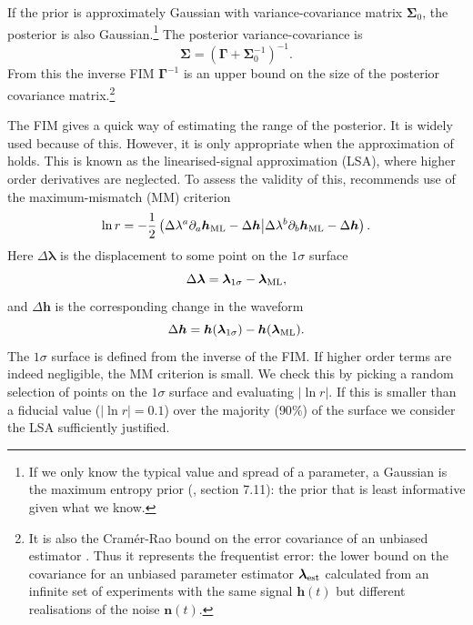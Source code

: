 If the prior is approximately Gaussian with variance-covariance matrix $\boldsymbol{\Sigma}_0$, the posterior is also Gaussian.\footnote{If we only know the typical value and spread of a parameter, a Gaussian is the maximum entropy prior (\citealt{Jaynes2003}, section 7.11): the prior that is least informative given what we know.} The posterior variance-covariance is \citep{Cutler1994, Vallisneri2008}
\begin{equation}
\boldsymbol{\Sigma} = \left(\boldsymbol{\Gamma} + \boldsymbol{\Sigma}_0^{-1}\right)^{-1}.
\label{eq:Posterior_variance}
\end{equation}
From this the inverse FIM $\boldsymbol{\Gamma}^{-1}$ is an upper bound on the size of the posterior covariance matrix.\footnote{It is also the Cram\'{e}r-Rao bound on the error covariance of an unbiased estimator \citep{Cutler1994, Vallisneri2008}. Thus it represents the frequentist error: the lower bound on the covariance for an unbiased parameter estimator $\boldsymbol{\lambda}_\mathrm{est}$ calculated from an infinite set of experiments with the same signal $\boldsymbol{h}(t)$ but different realisations of the noise $\boldsymbol{n}(t)$.}

The FIM gives a quick way of estimating the range of the posterior. It is widely used because of this. However, it is only appropriate when the approximation of  holds. This is known as the linearised-signal approximation (LSA), where higher order derivatives are neglected. To assess the validity of this, \citet{Vallisneri2008} recommends use of the maximum-mismatch (MM) criterion
\begin{equation}
\ln r = -\frac{1}{2}\left({\Delta\lambda^a\partial_a\boldsymbol{h}_\mathrm{ML} - \Delta\boldsymbol{h}}\middle|{\Delta\lambda^b\partial_b\boldsymbol{h}_\mathrm{ML} - \Delta\boldsymbol{h}}\right).
\end{equation}
Here $\Delta \boldsymbol{\lambda}$ is the displacement to some point on the $1\sigma$ surface
\begin{equation}
\Delta \boldsymbol{\lambda} = \boldsymbol{\lambda}_\mathrm{1\sigma} - \boldsymbol{\lambda}_\mathrm{ML},
\end{equation}
and $\Delta \boldsymbol{h}$ is the corresponding change in the waveform
\begin{equation}
\Delta \boldsymbol{h} = \boldsymbol{h}(\boldsymbol{\lambda}_\mathrm{1\sigma}) - \boldsymbol{h}(\boldsymbol{\lambda}_\mathrm{ML}).
\end{equation}
The $1\sigma$ surface is defined from the inverse of the FIM. If higher order terms are indeed negligible, the MM criterion is small. We check this by picking a random selection of points on the $1\sigma$ surface and evaluating $|\ln r|$. If this is smaller than a fiducial value ($|\ln r| = 0.1$) over the majority ($90\%$) of the surface we consider the LSA sufficiently justified.

